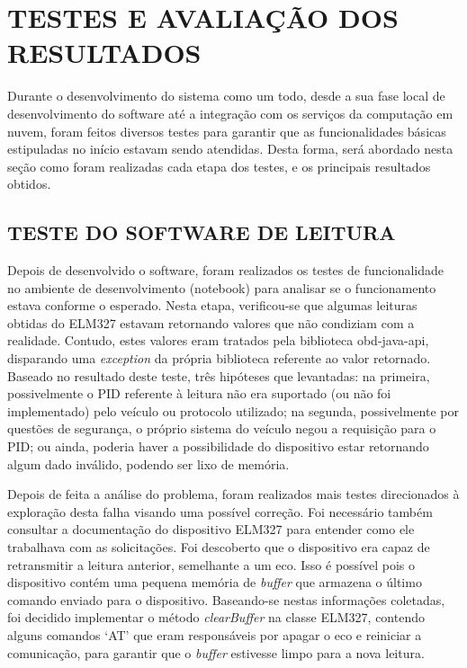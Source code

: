 \chapter{TESTES E AVALIAÇÃO DOS RESULTADOS}\label{CAP6}
Durante o desenvolvimento do sistema como um todo, desde a sua fase local de desenvolvimento do software até a integração com os serviços da computação em nuvem, foram feitos diversos testes para garantir que as funcionalidades básicas estipuladas no início estavam sendo atendidas. Desta forma, será abordado nesta seção como foram realizadas cada etapa dos testes, e os principais resultados obtidos.

\section{TESTE DO SOFTWARE DE LEITURA}
Depois de desenvolvido o software, foram realizados os testes de funcionalidade no ambiente de desenvolvimento (notebook) para analisar se o funcionamento estava conforme o esperado. Nesta etapa, verificou-se que algumas leituras obtidas do ELM327 estavam retornando valores que não condiziam com a realidade. Contudo, estes valores eram tratados pela biblioteca obd-java-api, disparando uma \textit{exception} da própria biblioteca referente ao valor retornado. Baseado no resultado deste teste, três hipóteses que levantadas: na primeira, possivelmente o PID referente à leitura não era suportado (ou não foi implementado) pelo veículo ou protocolo utilizado; na segunda, possivelmente por questões de segurança, o próprio sistema do veículo negou a requisição para o PID; ou ainda, poderia haver a possibilidade do dispositivo estar retornando algum dado inválido, podendo ser lixo de memória.

Depois de feita a análise do problema, foram realizados mais testes direcionados à exploração desta falha visando uma possível correção. Foi necessário também consultar a documentação do dispositivo ELM327 para entender como ele trabalhava com as solicitações. Foi descoberto que o dispositivo era capaz de retransmitir a leitura anterior, semelhante a um eco. Isso é possível pois o dispositivo contém uma pequena memória de \textit{buffer} que armazena o último comando enviado para o dispositivo. Baseando-se nestas informações coletadas, foi decidido implementar o método \textit{clearBuffer} na classe ELM327, contendo alguns comandos ‘AT’ que eram responsáveis por apagar o eco e reiniciar a comunicação, para garantir que o \textit{buffer} estivesse limpo para a nova leitura.

